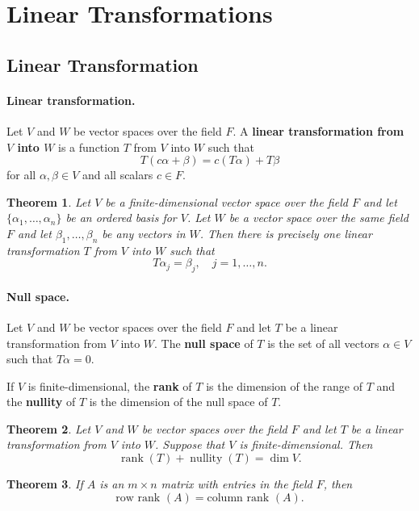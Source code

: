 \documentclass{article}
\DeclareMathOperator{\rank}{rank}
\DeclareMathOperator{\nullity}{nullity}
\newtheorem{theorem}{Theorem}[section]
\begin{document}
\section{Linear Transformations}

\subsection{Linear Transformation}

\paragraph{Linear transformation.} Let $V$ and $W$ be vector spaces over the
field $F$. A \textbf{linear transformation from $V$ into $W$} is a function $T$
from $V$ into $W$ such that \[
  T(c\alpha + \beta) = c(T\alpha) + T\beta
\] for all $\alpha, \beta \in V$ and all scalars $c \in F$.

\begin{theorem}
  Let $V$ be a finite-dimensional vector space over the field $F$ and let
  $\{\alpha_1, \ldots, \alpha_n\}$ be an ordered basis for $V$. Let $W$ be a
  vector space over the same field $F$ and let $\beta_1, \ldots, \beta_n$ be any
  vectors in $W$. Then there is precisely one linear transformation $T$ from $V$
  into $W$ such that \[
    T\alpha_j = \beta_j, \quad j = 1, \ldots, n.
  \]
\end{theorem}

\paragraph{Null space.} Let $V$ and $W$ be vector spaces over the field $F$ and
let $T$ be a linear transformation from $V$ into $W$. The \textbf{null space} of
$T$ is the set of all vectors $\alpha \in V$ such that $T\alpha = 0$.

If $V$ is finite-dimensional, the \textbf{rank} of $T$ is the dimension of the
range of $T$ and the \textbf{nullity} of $T$ is the dimension of the null space
of $T$.

\begin{theorem}
  Let $V$ and $W$ be vector spaces over the field $F$ and let $T$ be a linear
  transformation from $V$ into $W$. Suppose that $V$ is finite-dimensional. Then
  \[
    \rank(T) + \nullity(T) = \dim V.
  \]
\end{theorem}

\begin{theorem}
  If $A$ is an $m \times n$ matrix with entries in the field $F$, then \[
    \text{row rank }(A) = \text{column rank }(A).
  \]
\end{theorem}
\end{document}
